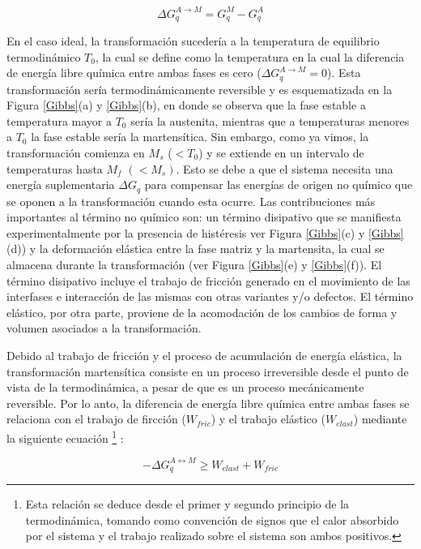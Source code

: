 \documentclass[12pt]{article}
\theoremstyle{definition}
\theoremstyle{remark}
\begin{document}
\begin{equation}
\Delta G^{A \rightarrow M}_q = G^M_q - G^A_q
\end{equation} 

En el caso ideal, la transformación sucedería a la temperatura de equilibrio termodinámico $T_0$, la cual se define como la temperatura en la cual la diferencia de energía libre química entre ambas fases es cero ($\Delta G^{A \rightarrow M}_q = 0$). Esta transformación sería termodinámicamente reversible y es esquematizada en la Figura \ref{Gibbs}(a) y \ref{Gibbs}(b), en donde se observa que la fase estable a temperatura mayor a $T_0$ sería la austenita, mientras que a temperaturas menores a $T_0$ la fase estable sería la martensítica. Sin embargo, como ya vimos, la transformación comienza en $M_s$  ($< T_0$) y se extiende en un intervalo de temperaturas hasta $M_f$  $(< M_s)$. Esto se debe a que el sistema necesita una energía suplementaria $\Delta G_q$ para compensar las energías de origen no químico que se oponen a la transformación cuando esta ocurre. Las contribuciones más importantes al término no químico son: un término disipativo que se manifiesta experimentalmente por la presencia de histéresis ver Figura \ref{Gibbs}(c) y \ref{Gibbs}(d)) y la deformación elástica entre la fase matriz y la martensita, la cual se almacena durante la transformación (ver Figura \ref{Gibbs}(e) y \ref{Gibbs}(f)). El término disipativo incluye el trabajo de fricción generado en el movimiento de las interfases e interacción de las mismas con otras variantes y/o defectos. El término elástico, por otra parte, proviene de la acomodación de los cambios de forma y volumen asociados a la transformación\cite{Wollants1993}.

Debido al trabajo de fricción y el proceso de acumulación de energía elástica, la transformación martensítica consiste en un proceso irreversible desde el punto de vista de la termodinámica, a pesar de que es un proceso mecánicamente reversible. Por lo anto, la diferencia de energía libre química entre ambas fases se relaciona con el trabajo de fircción ($W_{fric}$) y el trabajo elástico ($W_{elast}$) mediante la siguiente ecuación \footnote{Esta relación se deduce desde el primer y segundo principio de la termodinámica, tomando como convención de signos que el calor absorbido por el sistema y el trabajo realizado sobre el sistema son ambos positivos.} \cite{Isola2020}:

\begin{equation}
\label{GibbsEnergyEquation}
	- \Delta G_{q}^{A \leftrightarrow M} \geq W_{elast} + W_{fric}
\end{equation}
\end{document}
